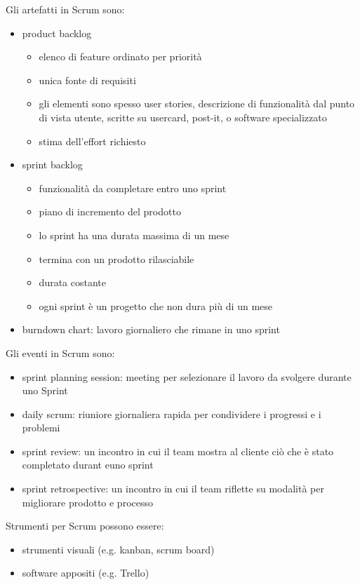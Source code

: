 \documentclass[answers, a4paper, 11pt]{exam}
\begin{document}
Gli artefatti in Scrum sono:

\begin{itemize}
    \item product backlog
    \begin{itemize}
        \item elenco di feature ordinato per priorità
        \item unica fonte di requisiti
        \item gli elementi sono spesso user stories, descrizione di funzionalità dal punto di vista utente, scritte su usercard, post-it, o software specializzato
        \item stima dell'effort richiesto
    \end{itemize}
    \item sprint backlog
    \begin{itemize}
        \item funzionalità da completare entro uno sprint
        \item piano di incremento del prodotto
        \item lo sprint ha una durata massima di un mese
        \item termina con un prodotto rilasciabile
        \item durata costante
        \item ogni sprint è un progetto che non dura più di un mese
    \end{itemize}
    \item burndown chart: lavoro giornaliero che rimane in uno sprint
\end{itemize}

Gli eventi in Scrum sono:

\begin{itemize}
    \item sprint planning session: meeting per selezionare il lavoro da svolgere durante uno Sprint
    \item daily scrum: riuniore giornaliera rapida per condividere i progressi e i problemi
    \item sprint review: un incontro in cui il team mostra al cliente ciò che è stato completato durant euno sprint
    \item sprint retrospective: un incontro in cui il team riflette su modalità per migliorare prodotto e processo
\end{itemize}

Strumenti per Scrum possono essere:

\begin{itemize}
    \item strumenti visuali (e.g. kanban, scrum board)
    \item software appositi (e.g. Trello)
\end{itemize}
\end{document}
